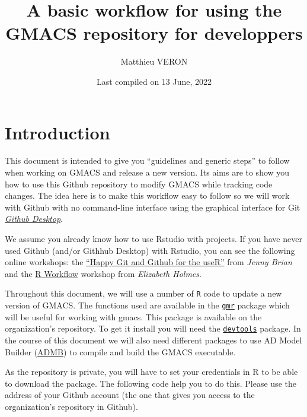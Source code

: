 \documentclass[
]{article}
\title{A basic workflow for using the GMACS repository for developpers}
\author{Matthieu VERON}
\date{Last compiled on 13 June, 2022}
\begin{document}
\maketitle

\hypertarget{introduction}{%
\section{Introduction}\label{introduction}}

This document is intended to give you ``guidelines and generic steps''
to follow when working on GMACS and release a new version. Its aims are
to show you how to use this Github repository to modify GMACS while
tracking code changes. The idea here is to make this workflow easy to
follow so we will work with Github with no command-line interface using
the graphical interface for Git
\emph{\href{https://desktop.github.com/}{Github Desktop}}.

We assume you already know how to use Rstudio with projects. If you have
never used Github (and/or Githhub Desktop) with Rstudio, you can see the
following online workshops: the
\href{https://happygitwithr.com/}{``Happy Git and Github for the useR''}
from \emph{Jenny Brian} and the
\href{https://rverse-tutorials.github.io/RWorkflow-NWFSC-2021/index.html}{R
Workflow} workshop from \emph{Elizabeth Holmes}.

Throughout this document, we will use a number of \texttt{R} code to
update a new version of GMACS. The functions used are available in the
\href{https://github.com/GMACS-project/gmr}{\texttt{gmr}} package which
will be useful for working with gmacs. This package is available on the
organization's repository. To get it install you will need the
\href{https://www.r-project.org/nosvn/pandoc/devtools.html}{\texttt{devtools}}
package. In the course of this document we will also need different
packages to use AD Model Builder
(\href{https://www.admb-project.org/}{ADMB}) to compile and build the
GMACS executable.

As the repository is private, you will have to set your credentials in R
to be able to download the package. The following code help you to do
this. Please use the address of your Github account (the one that gives
you access to the organization's repository in Github).
\end{document}
